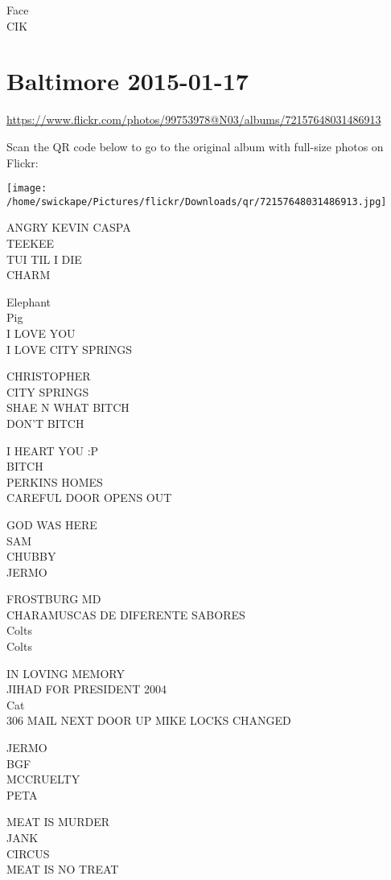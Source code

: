 \documentclass[10pt,letterpaper]{article}
\begin{document}
Face\\
CIK


\section*{Baltimore 2015-01-17}

\url{https://www.flickr.com/photos/99753978@N03/albums/72157648031486913}

Scan the QR code below to go to the original album with full-size photos on Flickr:

\texttt{[image: /home/swickape/Pictures/flickr/Downloads/qr/72157648031486913.jpg]}


ANGRY KEVIN CASPA\\
TEEKEE\\
TUI TIL I DIE\\
CHARM

Elephant\\
Pig\\
I LOVE YOU\\
I LOVE CITY SPRINGS

CHRISTOPHER\\
CITY SPRINGS\\
SHAE N WHAT BITCH\\
DON'T BITCH

I HEART YOU :P\\
BITCH\\
PERKINS HOMES\\
CAREFUL DOOR OPENS OUT

GOD WAS HERE\\
SAM\\
CHUBBY\\
JERMO

FROSTBURG MD\\
CHARAMUSCAS DE DIFERENTE SABORES\\
Colts\\
Colts

IN LOVING MEMORY\\
JIHAD FOR PRESIDENT 2004\\
Cat\\
306 MAIL NEXT DOOR UP MIKE LOCKS CHANGED

JERMO\\
BGF\\
MCCRUELTY\\
PETA

MEAT IS MURDER\\
JANK\\
CIRCUS\\
MEAT IS NO TREAT
\end{document}
